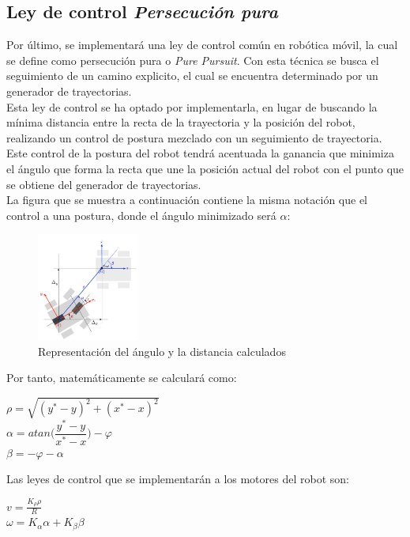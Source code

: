 \documentclass[a4paper,twoside]{article}
\begin{document}
\subsection{Ley de control \textit{Persecución pura}}
Por último, se implementará una ley de control común en robótica móvil, la cual se define como persecución pura o \textit{Pure Pursuit}. Con esta técnica se busca el seguimiento de un camino explicito, el cual se encuentra determinado por un generador de trayectorias.\\
Esta ley de control se ha optado por implementarla, en lugar de buscando la mínima distancia entre la recta de la trayectoria y la posición del robot, realizando un control de postura mezclado con un seguimiento de trayectoria. \\
Este control de la postura del robot tendrá acentuada la ganancia que minimiza el ángulo que forma la recta que une la posición actual del robot con el punto que se obtiene del generador de trayectorias.\\
La figura que se muestra a continuación contiene la misma notación que el control a una postura, donde el ángulo minimizado será $\alpha$:

\begin{figure}[h!]
   \centering
   \includegraphics[width=0.3\textwidth]{postura}
   \caption{Representación del ángulo y la distancia calculados}
\end{figure}

Por tanto, matemáticamente se calculará como:
\begin{center}
$\rho=\sqrt{(y^*-y)^2+(x^*-x)^2}$ \\
$\alpha=atan\Big(\dfrac{y^*-y}{x^*-x}\Big)-\varphi$ \\
$\beta=-\varphi-\alpha$
\end{center}

Las leyes de control que se implementarán a los motores del robot son:
\begin{center}
$v=\frac{K_{\rho}\rho}{R}$ \\
$\omega=K_{\alpha}\alpha + K_{\beta}\beta$
\end{center}
\end{document}
